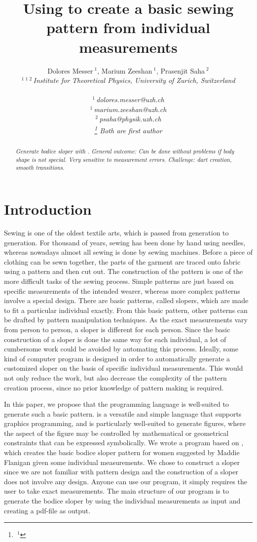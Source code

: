 \documentclass[10pt,letterpaper]{ltugboat}
\title{Using \MP { }to create a basic sewing pattern from individual measurements}
\author{%
{Dolores Messer{\small $~^{1}$}, Marium Zeeshan{\small $~^{1}$}, Prasenjit Saha{\small $~^{2}$}}%
\vspace{1.6mm}\\
\fontsize{10}{10}\selectfont\itshape
$^{1}$\,$^{1}$\,$^{2}$\,Institute for Theoretical Physics, University of Zurich, Switzerland\\
\fontsize{9}{9}\selectfont\ttfamily\upshape
\\
$^{1}$\,dolores.messer@uzh.ch\\
$^{1}$\,marium.zeeshan@uzh.ch\\
$^{2}$\,psaha@physik.uzh.ch
\vspace{1.2mm}\\
\fontsize{10}{10}\selectfont\rmfamily\itshape
\footnote{\small $~^{1}$} Both are first author}
\begin{document}
\maketitle
\lstset{language=MetaPost}
\begin{abstract} 
\textit{Generate bodice sloper with \MP. General outcome: Can be done without problems if body shape is not special. Very sensitive to measurement errors. Challenge: dart creation, smooth transitions.}
\end{abstract}

\section{Introduction}
\par Sewing is one of the oldest textile arts, which is passed from generation to generation. For thousand of years, sewing has been done by hand using needles, whereas nowadays almost all sewing is done by sewing machines. Before a piece of clothing can be sewn together, the parts of the garment are traced onto fabric using a pattern and then cut out. The construction of the pattern is one of the more difficult tasks of the sewing process. Simple patterns are just based on specific measurements of the intended wearer, whereas more complex patterns involve a special design. There are basic patterns, called slopers, which are made to fit a particular individual exactly. From this basic pattern, other patterns can be drafted by pattern manipulation techniques. As the exact measurements vary from person to person, a sloper is different for each person. Since the basic construction of a sloper is done the same way for each individual, a lot of cumbersome work could be avoided by automating this process. Ideally, some kind of computer program is designed in order to automatically generate a customized sloper on the basis of specific individual measurements. This would not only reduce the work, but also decrease the complexity of the pattern creation process, since no prior knowledge of pattern making is required.
\par In this paper, we propose that the programming language \MP { }is well-suited to generate such a basic pattern. \MP { }is a versatile and simple language that supports graphics programming, and is particularly well-suited to generate figures, where the aspect of the figure may be controlled by mathematical or geometrical constraints that can be expressed symbolically. We wrote a program based on \MP, which creates the basic bodice sloper pattern for women suggested by Maddie Flanigan \cite{maddie} given some individual measurements. We chose to construct a sloper since we are not familiar with pattern design and the construction of a sloper does not involve any design. Anyone can use our program, it simply requires the user to take exact measurements. The main structure of our program is to generate the bodice sloper by using the individual measurements as input and creating a pdf-file as output.
\end{document}
